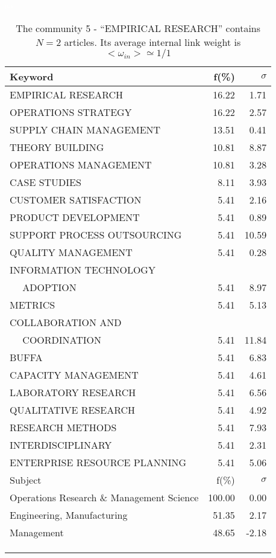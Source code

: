 \documentclass[a4paper,11pt]{report}
\begin{document}
\begin{landscape}
\clearpage

\begin{table}[!ht]
\caption{The community 5 - ``EMPIRICAL RESEARCH'' contains $N = 2$ articles. Its average internal link weight is $<\omega_{in}> \simeq 1/1$ }
\textcolor{white}{aa}\\
{\scriptsize\begin{tabular}{|l r r|}
\hline
Keyword & f(\%) & $\sigma$\\
\hline
EMPIRICAL RESEARCH & 16.22 & 1.71\\
OPERATIONS STRATEGY & 16.22 & 2.57\\
SUPPLY CHAIN MANAGEMENT & 13.51 & 0.41\\
THEORY BUILDING & 10.81 & 8.87\\
OPERATIONS MANAGEMENT & 10.81 & 3.28\\
CASE STUDIES & 8.11 & 3.93\\
CUSTOMER SATISFACTION & 5.41 & 2.16\\
PRODUCT DEVELOPMENT & 5.41 & 0.89\\
SUPPORT PROCESS OUTSOURCING & 5.41 & 10.59\\
QUALITY MANAGEMENT & 5.41 & 0.28\\
INFORMATION TECHNOLOGY &  & \\
$\quad$ ADOPTION & 5.41 & 8.97\\
METRICS & 5.41 & 5.13\\
COLLABORATION AND &  & \\
$\quad$ COORDINATION & 5.41 & 11.84\\
BUFFA & 5.41 & 6.83\\
CAPACITY MANAGEMENT & 5.41 & 4.61\\
LABORATORY RESEARCH & 5.41 & 6.56\\
QUALITATIVE RESEARCH & 5.41 & 4.92\\
RESEARCH METHODS & 5.41 & 7.93\\
INTERDISCIPLINARY & 5.41 & 2.31\\
ENTERPRISE RESOURCE PLANNING & 5.41 & 5.06\\
\hline
\hline
Subject & f(\%) & $\sigma$\\
\hline
Operations Research \& Management Science & 100.00 & 0.00\\
Engineering, Manufacturing & 51.35 & 2.17\\
Management & 48.65 & -2.18\\
 &  & \\
 &  & \\
 &  & \\

\end{tabular}}
\end{table}
\end{landscape}
\end{document}
